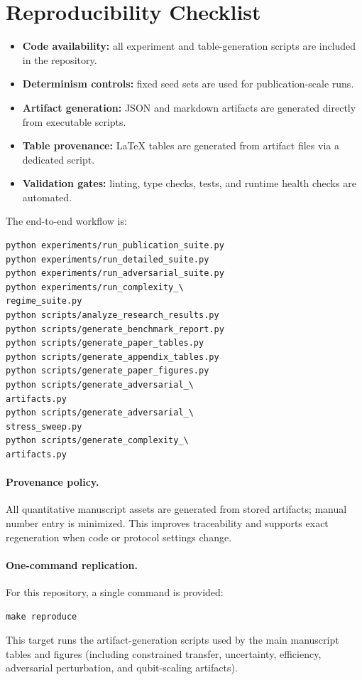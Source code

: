 \section{Reproducibility Checklist}

\begin{itemize}
    \item \textbf{Code availability:} all experiment and table-generation scripts are included in the repository.
    \item \textbf{Determinism controls:} fixed seed sets are used for publication-scale runs.
    \item \textbf{Artifact generation:} JSON and markdown artifacts are generated directly from executable scripts.
    \item \textbf{Table provenance:} LaTeX tables are generated from artifact files via a dedicated script.
    \item \textbf{Validation gates:} linting, type checks, tests, and runtime health checks are automated.
\end{itemize}

The end-to-end workflow is:
\begingroup
\scriptsize
\begin{verbatim}
python experiments/run_publication_suite.py
python experiments/run_detailed_suite.py
python experiments/run_adversarial_suite.py
python experiments/run_complexity_\
regime_suite.py
python scripts/analyze_research_results.py
python scripts/generate_benchmark_report.py
python scripts/generate_paper_tables.py
python scripts/generate_appendix_tables.py
python scripts/generate_paper_figures.py
python scripts/generate_adversarial_\
artifacts.py
python scripts/generate_adversarial_\
stress_sweep.py
python scripts/generate_complexity_\
artifacts.py
\end{verbatim}
\endgroup

\paragraph{Provenance policy.}
All quantitative manuscript assets are generated from stored artifacts; manual number entry is minimized. This improves traceability and supports exact regeneration when code or protocol settings change.

\paragraph{One-command replication.}
For this repository, a single command is provided:
\begingroup
\scriptsize
\begin{verbatim}
make reproduce
\end{verbatim}
\endgroup
This target runs the artifact-generation scripts used by the main manuscript tables and figures (including constrained transfer, uncertainty, efficiency, adversarial perturbation, and qubit-scaling artifacts).

